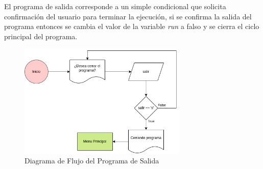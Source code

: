 \documentclass{article}
\begin{document}
El programa de salida corresponde a un simple condicional que solicita confirmación del usuario para terminar la ejecución, si se confirma la salida del programa entonces se cambia el valor de la variable \emph{run} a falso y se cierra el ciclo principal del programa.

\begin{figure}[h]
    \centering
    \includegraphics[width=8cm]{programa_salida}
    \caption{Diagrama de Flujo del Programa de Salida}
\end{figure}
\end{document}
